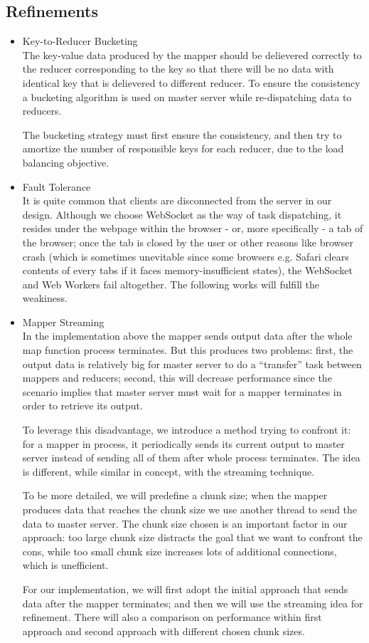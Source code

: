 \subsection{Refinements}

\begin{itemize}

\item Key-to-Reducer Bucketing\\
The key-value data produced by the mapper should be delievered correctly to the reducer corresponding to the key so that there will be no data with identical key that is delievered to different reducer. To ensure the consistency a bucketing algorithm is used on master server while re-dispatching data to reducers.

The bucketing strategy must first ensure the consistency, and then try to amortize the number of responsible keys for each reducer, due to the load balancing objective.

\item Fault Tolerance\\
It is quite common that clients are disconnected from the server in our design. Although we choose WebSocket as the way of task dispatching, it resides under the webpage within the browser - or, more specifically - a tab of the browser; once the tab is closed by the user or other reasons like browser crash (which is sometimes unevitable since some browsers e.g. Safari clears contents of every tabs if it faces memory-insufficient states), the WebSocket and Web Workers fail altogether. The following works will fulfill the weakiness.

\item Mapper Streaming\\
In the implementation above the mapper sends output data after the whole map function process terminates. But this produces two problems: first, the output data is relatively big for master server to do a “transfer” task between mappers and reducers; second, this will decrease performance since the scenario implies that master server must wait for a mapper terminates in order to retrieve its output.

To leverage this disadvantage, we introduce a method trying to confront it: for a mapper in process, it periodically sends its current output to master server instead of sending all of them after whole process terminates. The idea is different, while similar in concept, with the streaming technique.

To be more detailed, we will predefine a chunk size; when the mapper produces data that reaches the chunk size we use another thread to send the data to master server. The chunk size chosen is an important factor in our approach: too large chunk size distracts the goal that we want to confront the cons, while too small chunk size increases lots of additional connections, which is unefficient.

For our implementation, we will first adopt the initial approach that sends data after the mapper terminates; and then we will use the streaming idea for refinement. There will also a comparison on performance within first approach and second approach with different chosen chunk sizes.

\end{itemize}